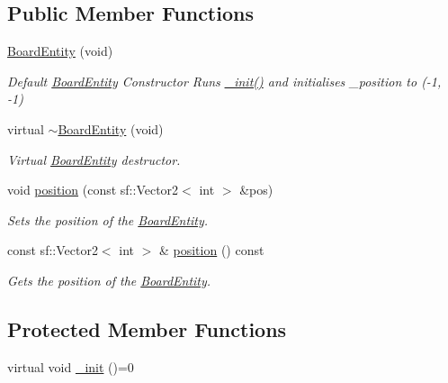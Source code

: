 \subsection*{Public Member Functions}
\begin{DoxyCompactItemize}
\item 
\hypertarget{class_board_entity_a809e46488b5db0ca8940176296548d4c}{\hyperlink{class_board_entity_a809e46488b5db0ca8940176296548d4c}{Board\-Entity} (void)}\label{class_board_entity_a809e46488b5db0ca8940176296548d4c}

\begin{DoxyCompactList}\small\item\em Default \hyperlink{class_board_entity}{Board\-Entity} Constructor Runs \hyperlink{class_board_entity_abb7251fa8167ce5618076a79427c8521}{\-\_\-init()} and initialises \-\_\-position to (-\/1, -\/1) \end{DoxyCompactList}\item 
\hypertarget{class_board_entity_a5856127ebd5b45c32e745cca13b0775d}{virtual \hyperlink{class_board_entity_a5856127ebd5b45c32e745cca13b0775d}{$\sim$\-Board\-Entity} (void)}\label{class_board_entity_a5856127ebd5b45c32e745cca13b0775d}

\begin{DoxyCompactList}\small\item\em Virtual \hyperlink{class_board_entity}{Board\-Entity} destructor. \end{DoxyCompactList}\item 
void \hyperlink{class_board_entity_a177b0ebff2150101415eb70b4fc677cb}{position} (const sf\-::\-Vector2$<$ int $>$ \&pos)
\begin{DoxyCompactList}\small\item\em Sets the position of the \hyperlink{class_board_entity}{Board\-Entity}. \end{DoxyCompactList}\item 
const sf\-::\-Vector2$<$ int $>$ \& \hyperlink{class_board_entity_aef7592bf7ad04fb47402cbbea5fac723}{position} () const 
\begin{DoxyCompactList}\small\item\em Gets the position of the \hyperlink{class_board_entity}{Board\-Entity}. \end{DoxyCompactList}\end{DoxyCompactItemize}
\subsection*{Protected Member Functions}
\begin{DoxyCompactItemize}
\item 
virtual void \hyperlink{class_board_entity_abb7251fa8167ce5618076a79427c8521}{\-\_\-init} ()=0
\end{DoxyCompactItemize}
